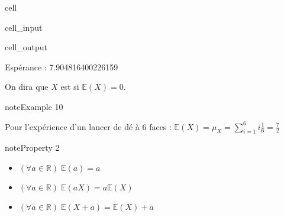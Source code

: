 \documentclass[letterpaper,10pt,french]{sphinxmanual}
\begin{document}
\begin{sphinxuseclass}{cell}
\begin{sphinxuseclass}{cell_input}
\begin{sphinxVerbatim}[commandchars=\\\{\}]
   
   
   
   
 
      
           
  
     
\end{sphinxVerbatim}

\end{sphinxuseclass}
\begin{sphinxuseclass}{cell_output}
\begin{sphinxVerbatim}[commandchars=\\\{\}]
Espérance :  7.904816400226159
\end{sphinxVerbatim}

\end{sphinxuseclass}
\end{sphinxuseclass}
\sphinxAtStartPar
On dira que \(X\) est  si \(\mathbb{E}(X)=0\).
\label{Rappels:example-26}
\begin{sphinxadmonition}{note}{Example 10}



\sphinxAtStartPar
Pour l’expérience d’un lancer de dé à 6 faces  : \(\mathbb E(X) = \mu_X = \displaystyle\sum_{i=1}^6 i\frac16 = \frac72\)
\end{sphinxadmonition}
\label{Rappels:property-27}
\begin{sphinxadmonition}{note}{Property 2}


\begin{itemize}
\item {} 
\sphinxAtStartPar
\((\forall a\in\mathbb{R})\; \mathbb{E}(a)= a\)

\item {} 
\sphinxAtStartPar
\((\forall a\in\mathbb{R})\; \mathbb{E}(aX)= a\mathbb{E}(X)\)

\item {} 
\sphinxAtStartPar
\((\forall a\in\mathbb{R})\; \mathbb{E}(X+a) = \mathbb{E}(X) +a\)

\end{itemize}
\end{sphinxadmonition}
\end{document}
